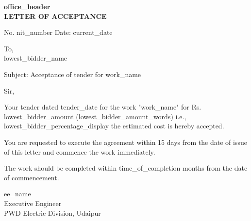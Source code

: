 \documentclass[12pt,a4paper]{article}
\begin{document}
\begin{center}
\textbf{{{office_header}}}\\[0.3cm]
\textbf{LETTER OF ACCEPTANCE}\\[0.2cm]
\end{center}

\vspace{0.5cm}

\noindent
No. {{nit_number}} \hfill Date: {{current_date}}

\vspace{0.5cm}

\noindent
To,\\
{{lowest_bidder_name}}

\vspace{0.3cm}

\noindent
Subject: Acceptance of tender for {{work_name}}

\vspace{0.3cm}

\noindent
Sir,

\vspace{0.3cm}

\noindent
Your tender dated {{tender_date}} for the work "{{work_name}}" for Rs. {{lowest_bidder_amount}} ({{lowest_bidder_amount_words}}) i.e., {{lowest_bidder_percentage_display}} the estimated cost is hereby accepted.

\vspace{0.3cm}

\noindent
You are requested to execute the agreement within 15 days from the date of issue of this letter and commence the work immediately.

\vspace{0.3cm}

\noindent
The work should be completed within {{time_of_completion}} months from the date of commencement.

\vspace{1cm}

\noindent
\hfill {{ee_name}}\\
\hfill Executive Engineer\\
\hfill PWD Electric Division, Udaipur
\end{document}
